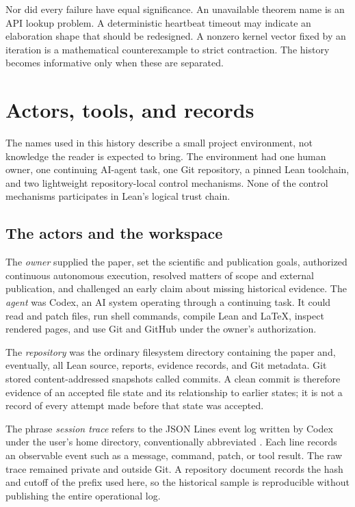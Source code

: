 \documentclass[11pt,a4paper]{article}
\newcommand{\artifact}[1]{\texttt{\detokenize{#1}}}
\begin{document}
Nor did every failure have equal significance. An unavailable theorem name is an API
lookup problem. A deterministic heartbeat timeout may indicate an elaboration shape
that should be redesigned. A nonzero kernel vector fixed by an iteration is a
mathematical counterexample to strict contraction. The history becomes informative
only when these are separated.

\section{Actors, tools, and records}
\label{sec:environment}

The names used in this history describe a small project environment, not knowledge
the reader is expected to bring. The environment had one human owner, one continuing
AI-agent task, one Git repository, a pinned Lean toolchain, and two lightweight
repository-local control mechanisms. None of the control mechanisms participates in
Lean's logical trust chain.

\subsection{The actors and the workspace}

The \emph{owner} supplied the paper, set the scientific and publication goals,
authorized continuous autonomous execution, resolved matters of scope and external
publication, and challenged an early claim about missing historical evidence. The
\emph{agent} was Codex, an AI system operating through a continuing task. It could
read and patch files, run shell commands, compile Lean and LaTeX, inspect rendered
pages, and use Git and GitHub under the owner's authorization.

The \emph{repository} was the ordinary filesystem directory containing the paper and,
eventually, all Lean source, reports, evidence records, and Git metadata. Git stored
content-addressed snapshots called commits. A clean commit is therefore evidence of
an accepted file state and its relationship to earlier states; it is not a record of
every attempt made before that state was accepted.

The phrase \emph{session trace} refers to the JSON Lines event log written by Codex
under the user's home directory, conventionally abbreviated \artifact{~/.codex/}.
Each line records an observable event such as a message, command, patch, or tool
result. The raw trace remained private and outside Git. A repository document records
the hash and cutoff of the prefix used here, so the historical sample is reproducible
without publishing the entire operational log.
\end{document}
